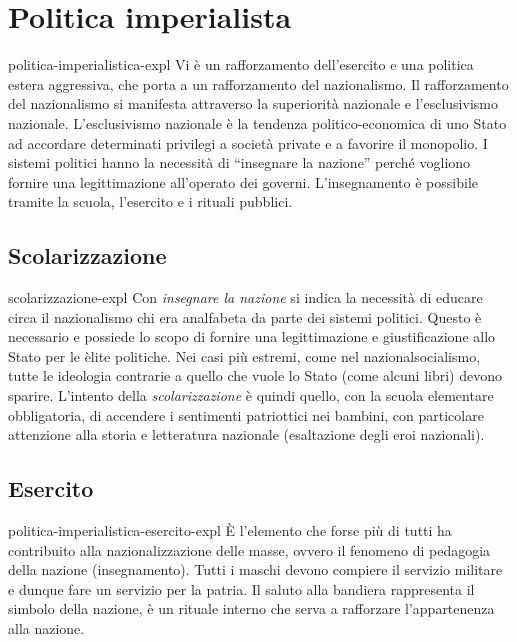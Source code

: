 \documentclass[preview]{standalone}
\begin{document}
\section{Politica imperialista}

\begin{snippet}{politica-imperialistica-expl}
    Vi è un rafforzamento dell'esercito e una politica estera aggressiva, che porta a un
    rafforzamento del nazionalismo. Il rafforzamento del nazionalismo si manifesta attraverso la
    superiorità nazionale e l'esclusivismo nazionale. L'esclusivismo nazionale è la tendenza
    politico-economica di uno Stato ad accordare determinati privilegi a società private e a
    favorire il monopolio. I sistemi politici hanno la necessità di “insegnare la nazione” perché
    vogliono fornire una legittimazione all'operato dei governi. L'insegnamento è possibile
    tramite la scuola, l'esercito e i rituali pubblici.
\end{snippet}

\subsection{Scolarizzazione}

\begin{snippet}{scolarizzazione-expl}
    Con \textit{insegnare la nazione} si indica la necessità di educare circa il nazionalismo
    chi era analfabeta da parte dei sistemi politici.
    Questo è necessario e possiede lo scopo di fornire una legittimazione e
    giustificazione allo Stato per le èlite politiche.
    Nei casi più estremi, come nel nazionalsocialismo, tutte le ideologia
    contrarie a quello che vuole lo Stato (come alcuni libri) devono sparire.
    L'intento della \textit{scolarizzazione} è quindi quello,
    con la scuola elementare obbligatoria, di accendere i sentimenti patriottici nei bambini,
    con particolare attenzione alla storia e letteratura nazionale (esaltazione degli eroi nazionali).
\end{snippet}

\subsection{Esercito}

\begin{snippet}{politica-imperialistica-esercito-expl}
    È l'elemento che forse più di tutti ha contribuito alla nazionalizzazione delle masse,
    ovvero il fenomeno di pedagogia della nazione (insegnamento).
    Tutti i maschi devono compiere il servizio militare e dunque fare un servizio per la patria.
    Il saluto alla bandiera rappresenta il simbolo della nazione, è un rituale
    interno che serva a rafforzare l'appartenenza alla nazione.
\end{snippet}
\end{document}
